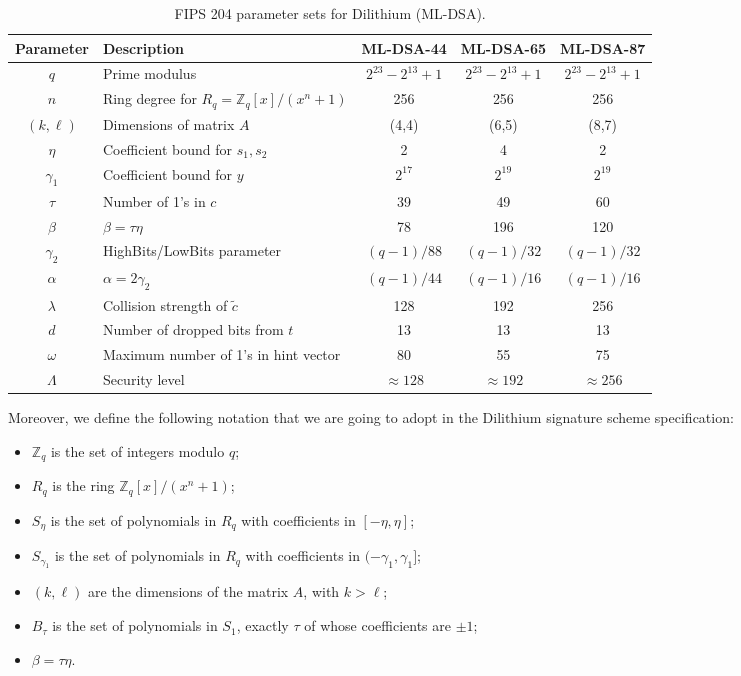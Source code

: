 \documentclass[binding=0.6cm,oneside,noexaminfo]{sapthesis}
\begin{document}
\begin{table}[H]
  \centering
  \caption{FIPS 204 parameter sets for Dilithium (ML-DSA).}
  \label{tab:mldsa_parameters}
  \small
  \renewcommand{\arraystretch}{1.3}
  \begin{tabularx}{\textwidth}{|c|X|c|c|c|}
    \hline
    \textbf{Parameter} & \textbf{Description} & \textbf{ML-DSA-44} & \textbf{ML-DSA-65} & \textbf{ML-DSA-87} \\ \hline
    $q$ & Prime modulus & $2^{23} - 2^{13} + 1$ & $2^{23} - 2^{13} + 1$ & $2^{23} - 2^{13} + 1$ \\ \hline
    $n$ & Ring degree for $R_q = \mathbb{Z}_q[x]/(x^n + 1)$ & 256 & 256 & 256 \\ \hline
    $(k, \ell)$ & Dimensions of matrix $A$ & (4,4) & (6,5) & (8,7) \\ \hline
    $\eta$ & Coefficient bound for $s_1, s_2$ & 2 & 4 & 2 \\ \hline
    $\gamma_1$ & Coefficient bound for $y$ & $2^{17}$ & $2^{19}$ & $2^{19}$ \\ \hline
    $\tau$ & Number of 1's in $c$ & 39 & 49 & 60 \\ \hline
    $\beta$ & $\beta = \tau\eta$ & 78 & 196 & 120 \\ \hline
    $\gamma_2$ & HighBits/LowBits parameter & $(q - 1)/88$ & $(q - 1)/32$ & $(q - 1)/32$ \\ \hline
    $\alpha$ & $\alpha = 2\gamma_2$ & $(q - 1)/44$ & $(q - 1)/16$ & $(q - 1)/16$ \\ \hline
    $\lambda$ & Collision strength of $\tilde{c}$ & 128 & 192 & 256 \\ \hline
    $d$ & Number of dropped bits from $t$ & 13 & 13 & 13 \\ \hline
    $\omega$ & Maximum number of 1's in hint vector & 80 & 55 & 75 \\ \hline
    $\Lambda$ & Security level & $\approx 128$ & $\approx 192$ & $\approx 256$ \\ \hline
  \end{tabularx}
\end{table}

Moreover, we define the following notation that we are going to adopt in the Dilithium signature scheme specification:
\begin{itemize}
  \item $\mathbb{Z}_q$ is the set of integers modulo $q$;
  \item $R_q$ is the ring $\mathbb{Z}_q[x]/(x^n + 1)$;
  \item $S_{\eta}$ is the set of polynomials in $R_q$ with coefficients in $[-\eta, \eta]$;
  \item $S_{\gamma_1}$ is the set of polynomials in $R_q$ with coefficients in $(-\gamma_1, \gamma_1]$;
  \item $(k, \ell)$ are the dimensions of the matrix $A$, with $k > \ell$;
  \item $B_{\tau}$ is the set of polynomials in $S_1$, exactly $\tau$ of whose coefficients are $\pm 1$;
  \item $\beta = \tau\eta$.
\end{itemize}
\end{document}
